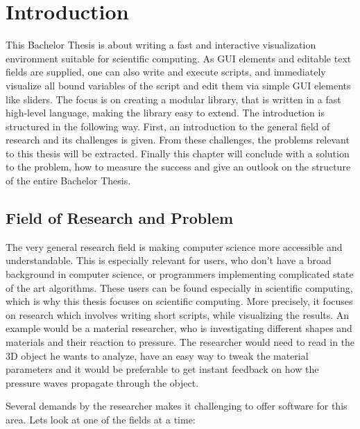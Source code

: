 \section{Introduction}
This Bachelor Thesis is about writing a fast and interactive visualization environment suitable for scientific computing. 
As GUI elements and editable text fields are supplied, one can also write and execute scripts, and immediately visualize all bound variables of the script and edit them via simple GUI elements like sliders. The focus is on creating a modular library, that is written in a fast high-level language, making the library easy to extend.
The introduction is structured in the following way.
First, an introduction to the general field of research and its challenges is given. 
From these challenges, the problems relevant to this thesis will be extracted.
Finally this chapter will conclude with a solution to the problem, how to measure the success and give an outlook on the structure of the entire Bachelor Thesis.
 
\subsection{Field of Research and Problem}


The very general research field is making computer science more accessible and understandable. 
This is especially relevant for users, who don't have a broad background in computer science, or programmers implementing complicated state of the art algorithms.
These users can be found especially in scientific computing, which is why this thesis focuses on scientific computing. 
More precisely, it focuses on research which involves writing short scripts, while visualizing the results. 
An example would be a material researcher, who is investigating different shapes and materials and their reaction to pressure.
The researcher would need to read in the 3D object he wants to analyze, have an easy way to tweak the material parameters and it would be preferable to get instant feedback on how the pressure waves propagate through the object.

Several demands by the researcher makes it challenging to offer software for this area.
Lets look at one of the fields at a time:

